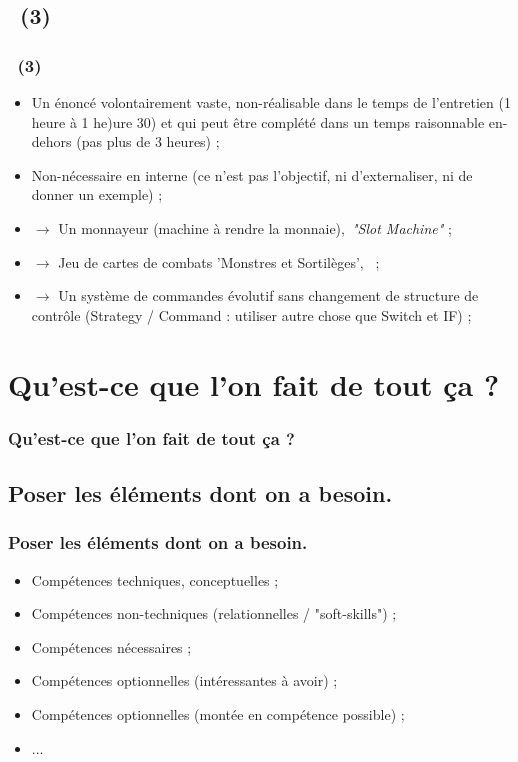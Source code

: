 \documentclass{beamer}
\begin{document}
\subsection{\titleExemplesCyberFizzBuzz ~(3)}
\begin{frame}
	\frametitle{\titleExemplesCyberFizzBuzz ~(3)}
	\begin{itemize}
		\item Un {\'e}nonc{\'e} volontairement vaste, non-r{\'e}alisable dans le temps de l'entretien (1 heure {\`a} 1 he)ure 30) et qui peut {\^e}tre compl{\'e}t{\'e} dans un temps raisonnable en-dehors (pas plus de 3 heures) ; 
		\item Non-n{\'e}cessaire en interne (ce n'est pas l'objectif, ni d'externaliser, ni de donner un exemple) ; 
		\item $\rightarrow$ Un monnayeur (machine {\`a} rendre la monnaie),~\newline \emph{"Slot Machine"} ;
		\item $\rightarrow$ Jeu de cartes de combats 'Monstres et Sortil{\`e}ges',~ ;
		\item $\rightarrow$ Un syst{\`e}me de commandes {\'e}volutif sans changement de structure de contr{\^o}le (Strategy / Command : utiliser autre chose que Switch et IF) ; 
	\end{itemize}
\end{frame} 

\section{Qu'est-ce que l'on fait de tout \c{c}a ?}
\begin{frame}
	\frametitle{Qu'est-ce que l'on fait de tout \c{c}a ?}
	\tableofcontents[sections=4,currentsection,subsectionstyle=show/shaded/hide] %
\end{frame} 

\subsection{Poser les {\'e}l{\'e}ments dont on a besoin. }
\begin{frame}
	\frametitle{Poser les {\'e}l{\'e}ments dont on a besoin. }
	\begin{itemize}
		\item Comp{\'e}tences techniques, conceptuelles ; 
		\item Comp{\'e}tences non-techniques (relationnelles / "soft-skills") ; 
		\item Comp{\'e}tences n{\'e}cessaires ; 
		\item Comp{\'e}tences optionnelles (int{\'e}ressantes {\`a} avoir) ; 
		\item Comp{\'e}tences optionnelles (mont{\'e}e en comp{\'e}tence possible) ; 
		\item ... 
	\end{itemize}
\end{frame} 
\end{document}
